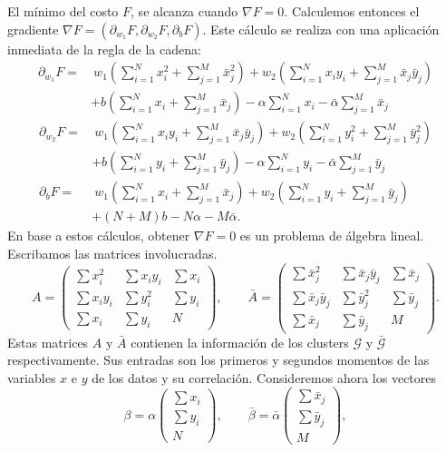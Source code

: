 \documentclass[12pt, a4paper]{amsbook}
\newcommand{\G}{{\mathcal G}}
\theoremstyle{remark}
\theoremstyle{definition}
\numberwithin{section}{chapter}
\numberwithin{subsection}{section}
\numberwithin{equation}{section}
\numberwithin{figure}{chapter}
\begin{document}
El mínimo del costo $F$, se alcanza cuando $\nabla F=0$. Calculemos entonces el gradiente $\nabla F=(\partial_{w_1} F, \partial_{w_2}F, \partial_b F)$. Este cálculo se realiza con una aplicación inmediata de la regla de la cadena:
\begin{align*}
\partial_{w_1} F =&\ w_1\left(\sum_{i=1}^N x_i^2 + \sum_{j=1}^M \bar x_j^2\right) + w_2\left(\sum_{i=1}^N x_i y_i + \sum_{j=1}^M \bar x_j \bar y_j\right)\\
& + b\left(\sum_{i=1}^N x_i + \sum_{j=1}^M \bar x_j\right) - \alpha\sum_{i=1}^N x_i - \bar\alpha \sum_{j=1}^M \bar x_j
\end{align*}
\begin{align*}
\partial_{w_2} F =&\ w_1 \left(\sum_{i=1}^N x_i y_i + \sum_{j=1}^M \bar x_j \bar y_j\right)+ w_2\left(\sum_{i=1}^N y_i^2 + \sum_{j=1}^M \bar y_j^2\right)\\
& + b\left(\sum_{i=1}^N y_i + \sum_{j=1}^M \bar y_j\right) - \alpha\sum_{i=1}^N y_i - \bar\alpha \sum_{j=1}^M \bar y_j\\
\partial_b F =&\ w_1\left(\sum_{i=1}^N x_i + \sum_{j=1}^M \bar x_j\right) + w_2\left(\sum_{i=1}^N y_i + \sum_{j=1}^M \bar y_j\right)\\
&+ (N+M) b - N\alpha - M\bar\alpha.
\end{align*}
En base a estos cálculos, obtener $\nabla F=0$ es un problema de álgebra lineal. Escribamos las matrices involucradas. 
\begin{equation}\label{A.barA}
A = \begin{pmatrix}
\sum x_i^2 & \sum x_i y_i & \sum x_i\\
\sum x_i y_i  & \sum y_i^2 & \sum y_i\\
\sum x_i & \sum y_i & N
\end{pmatrix},\qquad 
\bar A = \begin{pmatrix}
\sum \bar x_j^2 & \sum \bar x_j \bar y_j & \sum \bar x_j\\
\sum \bar x_j \bar y_j  & \sum \bar y_j^2 & \sum \bar y_j\\
\sum \bar x_j & \sum \bar y_j & M
\end{pmatrix}.
\end{equation}
Estas matrices $A$ y $\bar A$ contienen la información de los clusters $\G$ y $\bar\G$ respectivamente. Sus entradas son los primeros y segundos momentos de las variables $x$ e $y$ de los datos y su correlación. Consideremos ahora los vectores
$$
\beta = \alpha\begin{pmatrix}
\sum x_i\\ 
\sum y_i\\
N
\end{pmatrix},\qquad
\bar\beta = \bar\alpha\begin{pmatrix}
\sum \bar x_j\\ 
\sum \bar y_j\\
M
\end{pmatrix},
$$
\end{document}
